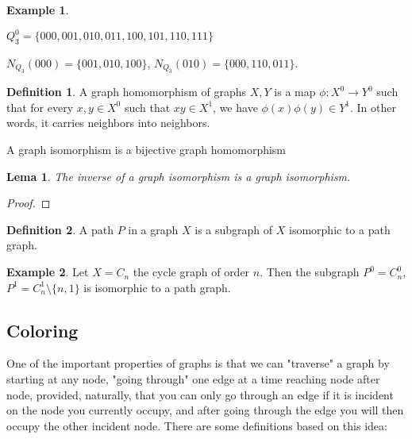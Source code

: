 \documentclass[]{article}
\newtheorem{lemma}{Lema}[section]
\theoremstyle{definition}
\newtheorem{definition}{Definition}[section]
\theoremstyle{definition}
\newtheorem{exmp}{Example}[section]
\newcommand{\raw}{\rightarrow}
\begin{document}
\begin{exmp}
\begin{center}
	$Q_3^0 = \{000, 001, 010, 011, 100,101,110,111\}$
	
	$N_{Q_3}(000) = \{001, 010, 100\}$, $N_{Q_3}(010) = \{000, 110, 011\}$.
\end{center}
	
\end{exmp}

\begin{definition}
	A graph homomorphism of graphs $X, Y$ is a map $\phi: X^0 \raw Y^0$ such that for every $x, y \in X^0$ such that $xy \in X^1$, we have $\phi(x)\phi(y) \in Y^1$. In other words, it carries neighbors into neighbors.

	A graph isomorphism is a bijective graph homomorphism
\end{definition}

\begin{lemma}
	The inverse of a graph isomorphism is a graph isomorphism.
\end{lemma}

\begin{proof}
	
\end{proof}

\begin{definition}
	A path $P$ in a graph $X$ is a subgraph of $X$ isomorphic to a path graph. 
\end{definition}

\begin{exmp}
	Let $X = C_n$ the cycle graph of order $n$. Then the subgraph $P^0 = C_n^0$, $P^1 = C_n^1 \setminus \{n, 1\}$ is isomorphic to a path graph.
\end{exmp}


\subsection{Coloring}


One of the important properties of graphs is that we can "traverse" a graph by starting at any node, "going through" one edge at a time reaching node after node, provided, naturally, that you can only go through an edge if it is incident on the node you currently occupy, and after going through the edge you will then occupy the other incident node. There are some definitions based on this idea:
\end{document}
